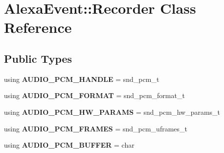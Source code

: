 \hypertarget{classAlexaEvent_1_1Recorder}{}\section{Alexa\+Event\+:\+:Recorder Class Reference}
\label{classAlexaEvent_1_1Recorder}
\subsection*{Public Types}
\begin{DoxyCompactItemize}
\item 
\mbox{\label{classAlexaEvent_1_1Recorder_a8bc3e90ccce14e035c3ccffb64adc93d}} 
using {\bfseries A\+U\+D\+I\+O\+\_\+\+P\+C\+M\+\_\+\+H\+A\+N\+D\+LE} = snd\+\_\+pcm\+\_\+t
\item 
\mbox{\label{classAlexaEvent_1_1Recorder_af973afd1233930dbe2b0b88e07db350a}} 
using {\bfseries A\+U\+D\+I\+O\+\_\+\+P\+C\+M\+\_\+\+F\+O\+R\+M\+AT} = snd\+\_\+pcm\+\_\+format\+\_\+t
\item 
\mbox{\label{classAlexaEvent_1_1Recorder_a2abdf52a7934f7ce0e1803536ee8bef6}} 
using {\bfseries A\+U\+D\+I\+O\+\_\+\+P\+C\+M\+\_\+\+H\+W\+\_\+\+P\+A\+R\+A\+MS} = snd\+\_\+pcm\+\_\+hw\+\_\+params\+\_\+t
\item 
\mbox{\label{classAlexaEvent_1_1Recorder_a10054764117aeddbcf4f4eb0ecbf83a8}} 
using {\bfseries A\+U\+D\+I\+O\+\_\+\+P\+C\+M\+\_\+\+F\+R\+A\+M\+ES} = snd\+\_\+pcm\+\_\+uframes\+\_\+t
\item 
\mbox{\label{classAlexaEvent_1_1Recorder_ab2178484018af392360c8ef31f6fd943}} 
using {\bfseries A\+U\+D\+I\+O\+\_\+\+P\+C\+M\+\_\+\+B\+U\+F\+F\+ER} = char
\end{DoxyCompactItemize}
